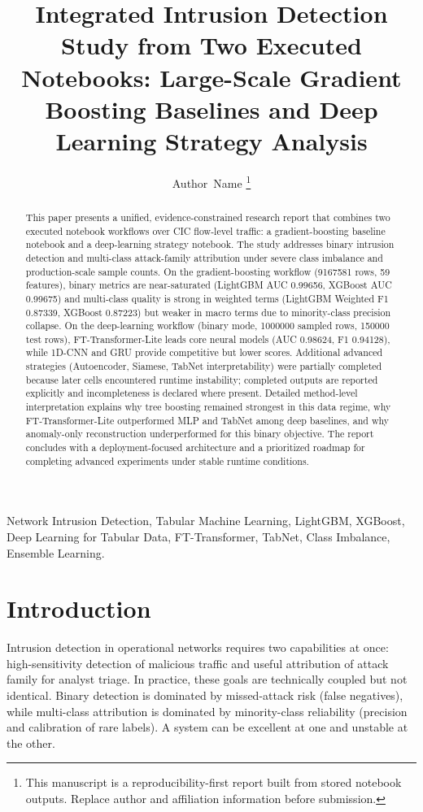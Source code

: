 \documentclass[10pt,journal]{IEEEtran}
\title{Integrated Intrusion Detection Study from Two Executed Notebooks: \newline Large-Scale Gradient Boosting Baselines and Deep Learning Strategy Analysis}
\author{Author~Name
\thanks{This manuscript is a reproducibility-first report built from stored notebook outputs. Replace author and affiliation information before submission.}}
\begin{document}
\maketitle

\begin{abstract}
This paper presents a unified, evidence-constrained research report that combines two executed notebook workflows over CIC flow-level traffic: a gradient-boosting baseline notebook and a deep-learning strategy notebook. The study addresses binary intrusion detection and multi-class attack-family attribution under severe class imbalance and production-scale sample counts. On the gradient-boosting workflow (\num{9167581} rows, 59 features), binary metrics are near-saturated (LightGBM AUC \num{0.99656}, XGBoost AUC \num{0.99675}) and multi-class quality is strong in weighted terms (LightGBM Weighted F1 \num{0.87339}, XGBoost \num{0.87223}) but weaker in macro terms due to minority-class precision collapse. On the deep-learning workflow (binary mode, \num{1000000} sampled rows, \num{150000} test rows), FT-Transformer-Lite leads core neural models (AUC \num{0.98624}, F1 \num{0.94128}), while 1D-CNN and GRU provide competitive but lower scores. Additional advanced strategies (Autoencoder, Siamese, TabNet interpretability) were partially completed because later cells encountered runtime instability; completed outputs are reported explicitly and incompleteness is declared where present. Detailed method-level interpretation explains why tree boosting remained strongest in this data regime, why FT-Transformer-Lite outperformed MLP and TabNet among deep baselines, and why anomaly-only reconstruction underperformed for this binary objective. The report concludes with a deployment-focused architecture and a prioritized roadmap for completing advanced experiments under stable runtime conditions.
\end{abstract}

\begin{IEEEkeywords}
Network Intrusion Detection, Tabular Machine Learning, LightGBM, XGBoost, Deep Learning for Tabular Data, FT-Transformer, TabNet, Class Imbalance, Ensemble Learning.
\end{IEEEkeywords}

\section{Introduction}
Intrusion detection in operational networks requires two capabilities at once: high-sensitivity detection of malicious traffic and useful attribution of attack family for analyst triage. In practice, these goals are technically coupled but not identical. Binary detection is dominated by missed-attack risk (false negatives), while multi-class attribution is dominated by minority-class reliability (precision and calibration of rare labels). A system can be excellent at one and unstable at the other.
\end{document}
